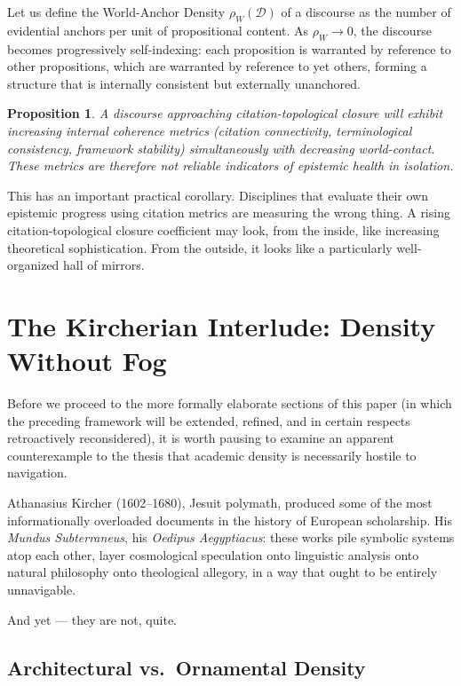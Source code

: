 \documentclass[12pt, a4paper]{article}
\newtheorem{proposition}{Proposition}
\begin{document}
Let us define the World-Anchor Density $\rho_W(\mathcal{D})$ of a discourse as the number of evidential anchors per unit of propositional content. As $\rho_W \to 0$, the discourse becomes progressively self-indexing: each proposition is warranted by reference to other propositions, which are warranted by reference to yet others, forming a structure that is internally consistent but externally unanchored.

\begin{proposition}
A discourse approaching citation-topological closure will exhibit increasing internal coherence metrics (citation connectivity, terminological consistency, framework stability) simultaneously with decreasing world-contact. These metrics are therefore not reliable indicators of epistemic health in isolation.
\end{proposition}

This has an important practical corollary. Disciplines that evaluate their own epistemic progress using citation metrics are measuring the wrong thing. A rising citation-topological closure coefficient may look, from the inside, like increasing theoretical sophistication. From the outside, it looks like a particularly well-organized hall of mirrors.


\section{The Kircherian Interlude: Density Without Fog}

Before we proceed to the more formally elaborate sections of this paper (in which the preceding framework will be extended, refined, and in certain respects retroactively reconsidered), it is worth pausing to examine an apparent counterexample to the thesis that academic density is necessarily hostile to navigation.

Athanasius Kircher (1602--1680), Jesuit polymath, produced some of the most informationally overloaded documents in the history of European scholarship. His \textit{Mundus Subterraneus}, his \textit{Oedipus Aegyptiacus}: these works pile symbolic systems atop each other, layer cosmological speculation onto linguistic analysis onto natural philosophy onto theological allegory, in a way that ought to be entirely unnavigable.

And yet --- they are not, quite.

\subsection{Architectural vs.\ Ornamental Density}
\end{document}
